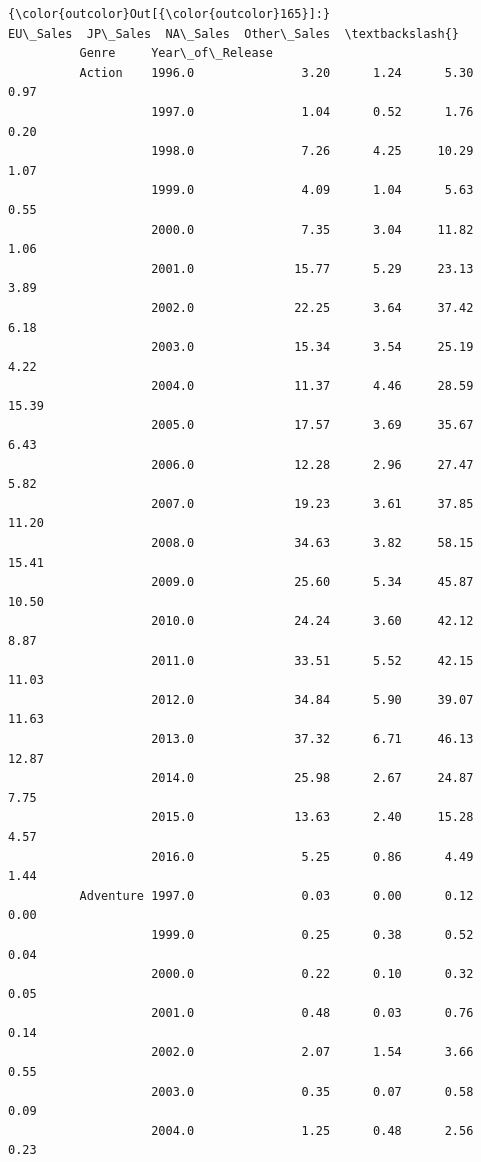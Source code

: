 \documentclass[11pt]{article}
\begin{document}
\begin{Verbatim}[commandchars=\\\{\}]
{\color{outcolor}Out[{\color{outcolor}165}]:}                            EU\_Sales  JP\_Sales  NA\_Sales  Other\_Sales  \textbackslash{}
          Genre     Year\_of\_Release                                              
          Action    1996.0               3.20      1.24      5.30         0.97   
                    1997.0               1.04      0.52      1.76         0.20   
                    1998.0               7.26      4.25     10.29         1.07   
                    1999.0               4.09      1.04      5.63         0.55   
                    2000.0               7.35      3.04     11.82         1.06   
                    2001.0              15.77      5.29     23.13         3.89   
                    2002.0              22.25      3.64     37.42         6.18   
                    2003.0              15.34      3.54     25.19         4.22   
                    2004.0              11.37      4.46     28.59        15.39   
                    2005.0              17.57      3.69     35.67         6.43   
                    2006.0              12.28      2.96     27.47         5.82   
                    2007.0              19.23      3.61     37.85        11.20   
                    2008.0              34.63      3.82     58.15        15.41   
                    2009.0              25.60      5.34     45.87        10.50   
                    2010.0              24.24      3.60     42.12         8.87   
                    2011.0              33.51      5.52     42.15        11.03   
                    2012.0              34.84      5.90     39.07        11.63   
                    2013.0              37.32      6.71     46.13        12.87   
                    2014.0              25.98      2.67     24.87         7.75   
                    2015.0              13.63      2.40     15.28         4.57   
                    2016.0               5.25      0.86      4.49         1.44   
          Adventure 1997.0               0.03      0.00      0.12         0.00   
                    1999.0               0.25      0.38      0.52         0.04   
                    2000.0               0.22      0.10      0.32         0.05   
                    2001.0               0.48      0.03      0.76         0.14   
                    2002.0               2.07      1.54      3.66         0.55   
                    2003.0               0.35      0.07      0.58         0.09   
                    2004.0               1.25      0.48      2.56         0.23   

\end{Verbatim}
\end{document}
